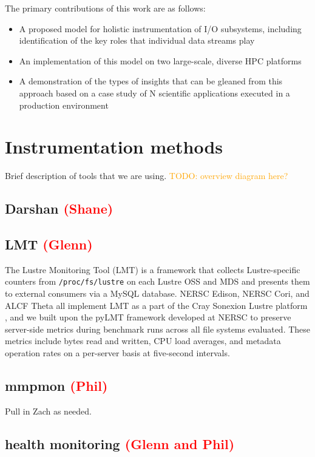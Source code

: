 \documentclass[conference,10pt,compsocconf]{IEEEtran}
\newcommand{\assign}[1]{\textcolor{red}{(#1)}}
\newcommand{\todo}[1]{\textcolor{Orange}{TODO: #1}}
\begin{document}
The primary contributions of this work are as follows:

\begin{itemize}
\item A proposed model for holistic instrumentation of I/O subsystems,
including identification of the key roles that individual data streams play
\item An implementation of this model on two large-scale, diverse HPC
platforms
\item A demonstration of the types of insights that can be gleaned from this
approach based on a case study of N scientific applications executed in a
production environment
\end{itemize}

\section{Instrumentation methods}

Brief description of tools that we are using.
\todo{overview diagram here?}

\subsection{Darshan \assign{Shane}}

\subsection{LMT \assign{Glenn}}

The Lustre Monitoring Tool (LMT) is a framework that collects Lustre-specific
counters from \texttt{/proc/fs/lustre} on each Lustre OSS and MDS and presents
them to external consumers via a MySQL database.  NERSC Edison, NERSC Cori, and
ALCF Theta all implement LMT as a part of the Cray Sonexion Lustre platform
\cite{Keopp2014}, and we built upon the pyLMT framework developed at NERSC
\cite{Uselton2009} to preserve server-side metrics during benchmark runs across
all file systems evaluated.  These metrics include bytes read and written, CPU
load averages, and metadata operation rates on a per-server basis at
five-second intervals.

\subsection{mmpmon \assign{Phil}}

Pull in Zach as needed.

\subsection{health monitoring \assign{Glenn and Phil}}
\end{document}
